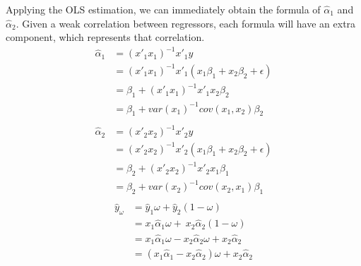 \documentclass{monashthesis}
\begin{document}
Applying the OLS estimation, we can immediately obtain the formula of \(\hat\alpha_{1}\) and \(\hat\alpha_{2}\). Given a weak correlation between regressors, each formula will have an extra component, which represents that correlation.
\begin{align*}
    \hat\alpha_{1} &= (x'_1x_1)^{-1} x'_1y \\
    &= (x'_1x_1)^{-1} x'_1(x_1 \beta_1 + x_2 \beta_2 + \epsilon) \\
    &= \beta_1 + (x'_1x_1)^{-1} x'_1x_2 \beta_2 \\
    &= \beta_1 + var(x_1)^{-1} cov(x_1,x_2) \beta_2 \\
    \\
    \hat\alpha_{2} &= (x'_2x_2)^{-1} x'_2y \\
    &= (x'_2x_2)^{-1} x'_2(x_1 \beta_1 + x_2 \beta_2 + \epsilon) \\
    &= \beta_2 + (x'_2x_2)^{-1} x'_2x_1 \beta_1 \\
    &= \beta_2 + var(x_2)^{-1} cov(x_2,x_1) \beta_1 \\
\end{align*}
\begin{align*}
    \hat y_{\omega} &= \hat y_1 \omega + \hat y_2 (1-\omega) \\
    &= x_1 \hat\alpha_1 \omega + \ x_2 \hat\alpha_2 (1-\omega) \\
    &= x_1 \hat\alpha_1 \omega - x_2 \hat\alpha_2 \omega + x_2 \hat\alpha_2 \\
    &= (x_1 \hat\alpha_1 - x_2 \hat\alpha_2) \omega + x_2 \hat\alpha_2 
\end{align*}
\end{document}

